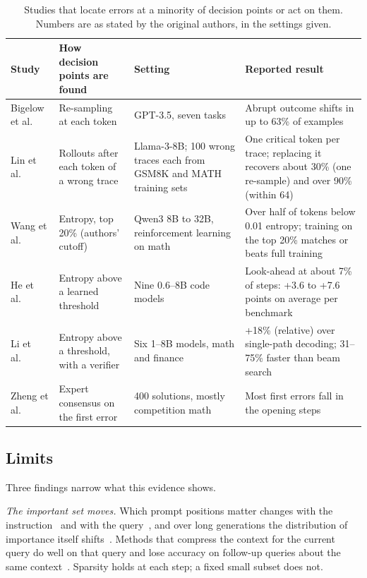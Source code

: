 \documentclass{ieeeaccess}
\newcommand{\rowgap}{\addlinespace[2.5pt]}
\begin{document}
\begin{table}[!t]
\caption{Studies that locate errors at a minority of decision points or act on them. Numbers are as stated by the original authors, in the settings given.}
\label{tab:hardness}
\centering
\footnotesize
\begin{tabular}{@{}>{\raggedright\arraybackslash}p{2.7cm}>{\raggedright\arraybackslash}p{4.2cm}>{\raggedright\arraybackslash}p{4.6cm}>{\raggedright\arraybackslash}p{5.0cm}@{}}
\toprule
\textbf{Study} & \textbf{How decision points are found} & \textbf{Setting} & \textbf{Reported result} \\
\midrule
Bigelow et al.~\cite{bigelow2025forking} & Re-sampling at each token & GPT-3.5, seven tasks & Abrupt outcome shifts in up to 63\% of examples \\
\rowgap Lin et al.~\cite{lin2024critical} & Rollouts after each token of a wrong trace & Llama-3-8B; 100 wrong traces each from GSM8K and MATH training sets & One critical token per trace; replacing it recovers about 30\% (one re-sample) and over 90\% (within 64) \\
\rowgap Wang et al.~\cite{wang2025beyond8020} & Entropy, top 20\% (authors' cutoff) & Qwen3 8B to 32B, reinforcement learning on math & Over half of tokens below 0.01 entropy; training on the top 20\% matches or beats full training \\
\rowgap He et al.~\cite{he2025adadec} & Entropy above a learned threshold & Nine 0.6--8B code models & Look-ahead at about 7\% of steps: +3.6 to +7.6 points on average per benchmark \\
\rowgap Li et al.~\cite{li2025egb} & Entropy above a threshold, with a verifier & Six 1--8B models, math and finance & +18\% (relative) over single-path decoding; 31--75\% faster than beam search \\
\rowgap Zheng et al.~\cite{zheng2025processbench} & Expert consensus on the first error & 3{,}400 solutions, mostly competition math & Most first errors fall in the opening steps \\
\bottomrule
\end{tabular}
\end{table}

\subsection{Limits}
Three findings narrow what this evidence shows.

\emph{The important set moves.} Which prompt positions matter changes with the instruction~\cite{li2024snapkv} and with the query~\cite{tang2024quest}, and over long generations the distribution of importance itself shifts~\cite{li2025scbench}. Methods that compress the context for the current query do well on that query and lose accuracy on follow-up queries about the same context~\cite{li2025scbench}. Sparsity holds at each step; a fixed small subset does not.
\end{document}
